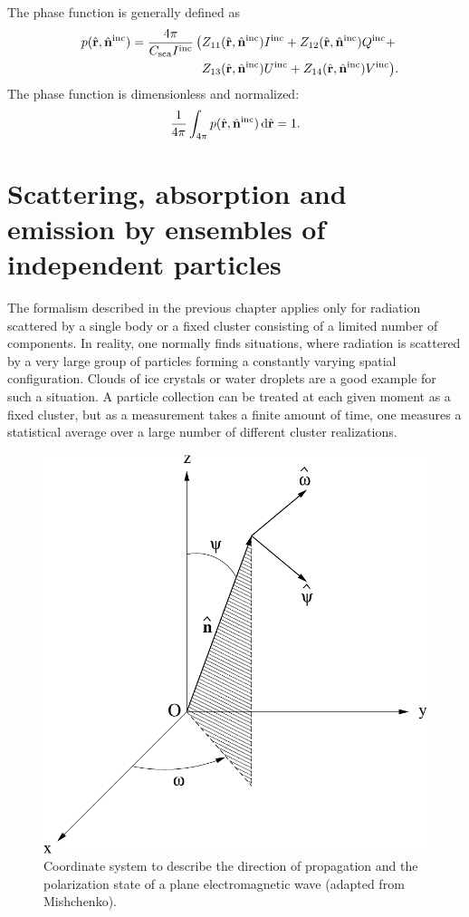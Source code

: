 The phase function is generally defined as
\begin{eqnarray}\label{eq:rtetheory:phase_function}
  p(\hat{\VctStl{r}}, \hat{\VctStl{n}}^{\inc}) =
    \frac{4\pi}{C_{\sca} I^{\inc}} \, \bigl( &
         Z_{11}(\hat{\VctStl{r}}, \hat{\VctStl{n}}^{\inc})I^{\inc}
       + Z_{12}(\hat{\VctStl{r}}, \hat{\VctStl{n}}^{\inc})Q^{\inc} \rlap{${}+$} \\
    &    Z_{13}(\hat{\VctStl{r}}, \hat{\VctStl{n}}^{\inc})U^{\inc}
       + Z_{14}(\hat{\VctStl{r}}, \hat{\VctStl{n}}^{\inc})V^{\inc} \rlap{$\bigr)$.}
 \end{eqnarray}
The phase function is dimensionless and normalized:
\begin{equation}
  \frac{1}{4\pi}\int_{4\pi} 
  p(\hat{\mathbf{r}}, \hat{\mathbf{n}}^{\mathrm{inc}}) \,\mathrm{d}\hat{\mathbf{r}} = 1.
\end{equation}



\section[Particle Ensembles]{Scattering, absorption and emission by ensembles of independent particles}
\label{sec:rtetheory:part_ensembles}

The formalism described in the previous chapter applies only for
radiation scattered by a single body or a fixed cluster consisting of
a limited number of components. In reality, one normally finds
situations, where radiation is scattered by a very large group of
particles forming a constantly varying spatial configuration. Clouds
of ice crystals or water droplets are a good example for such a
situation. A particle collection can be treated at each given moment
as a fixed cluster, but as a measurement takes a finite amount of
time, one measures a statistical average over a large number of
different cluster realizations.

\begin{figure}[t]
 \begin{center}
   \includegraphics*[width=0.6\hsize]{coordinate_system}
   \caption{Coordinate system to describe the direction of propagation and the polarization state of a plane electromagnetic wave (adapted from Mishchenko).}
  \label{fig:RT_theory_coordinates}  
 \end{center}
\end{figure}

